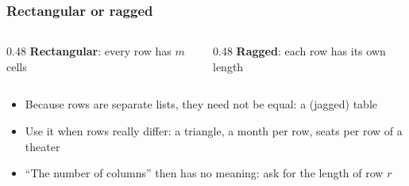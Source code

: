 \documentclass[aspectratio=169,10pt,compress]{beamer}
\begin{document}
\begin{frame}[t,fragile] \frametitle{Rectangular or ragged}
	\begin{columns}[T]
		\begin{column}{0.48\textwidth}
			\textbf{Rectangular}: every row has $m$ cells

			\vspace{0.8em}
		\end{column}
		\begin{column}{0.48\textwidth}
			\textbf{Ragged}: each row has its own length

			\vspace{0.8em}
		\end{column}
	\end{columns}

	\vspace{0.8em}
	\begin{itemize}\small
		\item Because rows are separate lists, they need not be equal: a  (jagged) table
		\item Use it when rows really differ: a triangle, a month per row, seats per row of a theater
		\item ``The number of columns'' then has no meaning: ask for the length of row $r$
	\end{itemize}
\end{frame}
\end{document}
